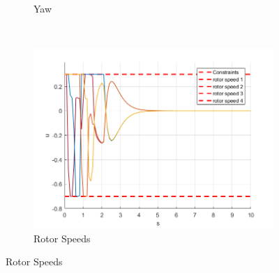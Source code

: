 \documentclass[11pt]{article}
\begin{document}
\begin{enumerate}
\begin{figure}[ht]
\begin{subfigure}[c]{0.3\linewidth}
            \caption{Yaw}
        \end{subfigure}
        ~
        \begin{subfigure}[c]{0.3\linewidth}
            \centering
            \includegraphics[width=\linewidth]{Plots_03_FirstMPCController/03}
            \caption{Rotor Speeds}
        \end{subfigure}


\end{figure}
\end{enumerate}
\end{document}
